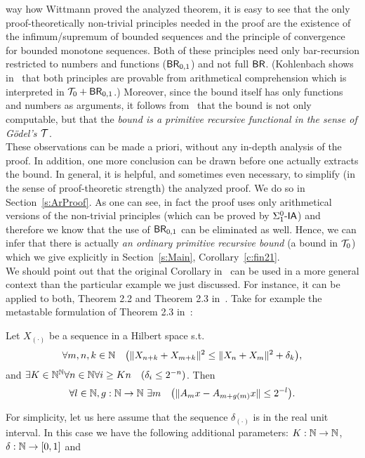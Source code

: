 way how Wittmann proved the analyzed theorem, it is easy to see 
that the only proof-theoretically non-trivial principles needed in the proof are 
the existence of the infimum/supremum of bounded sequences and 
the principle of convergence for bounded monotone sequences.
Both of these principles need only bar-recursion restricted to numbers and functions ($\textsf{\upshape BR}_{0,1}$)
and not full $\textsf{\upshape BR}$. (Kohlenbach shows in~\cite{Kohlenbach08, Kohlenbach00} that both principles
are provable from arithmetical comprehension which is interpreted in $\mathcal{T}_0+\textsf{\upshape BR}_{0,1}$.) 
Moreover, since the bound itself has only functions and numbers as arguments, 
it follows from~\cite{Schwichtenberg79, Kohlenbach99} that
the bound is not only computable, but that the {\em bound
is a primitive recursive functional in the sense of G\"odel's $\mathcal{T}$}.\\
These observations can be made a priori, without any in-depth analysis of the proof. In addition,
one more conclusion can be drawn before one actually extracts the bound. In general, it is helpful, and sometimes
even necessary, to simplify (in the sense of proof-theoretic strength) the analyzed proof. We do so
in Section~\ref{s:ArProof}. As one can see, in fact the proof uses only arithmetical versions of
the non-trivial principles (which can be proved by $\Sigma^0_1\textsf{\upshape -}\textsf{\upshape IA}$) and therefore we 
know that the use of $\textsf{\upshape BR}_{0,1}$ can be eliminated as well. 
Hence, we can infer that there is actually {\em an ordinary primitive recursive bound} (a bound in $\mathcal{T}_0$)
which we give explicitly in Section~\ref{s:Main}, Corollary~\ref{c:fin21}.\\
We should point out that the original Corollary in~\cite{GK08} can be used
in a more general context than the particular example we just discussed. For instance, it can be 
applied to both, Theorem 2.2 and Theorem 2.3 in~\cite{Wittmann90}. Take for example the metastable 
formulation of Theorem 2.3 in~\cite{Wittmann90}:
\begin{thm}\label{t:fin23l}
Let $X_{(\cdot)}$ be a sequence in a Hilbert space s.t. 
\[
\forall m,n,k\in\NN\quad \big(\|X_{n+k}+X_{m+k}\|^2 \leq \|X_{n}+X_{m}\|^2 + \delta_k\big), %
\] and $\exists K\in\mathbb{N}^{\mathbb{N}}\forall n\in\mathbb{N} \forall i\geq Kn\quad (\delta_i\leq 2^{-n})$.
Then
\[
\forall l\in\mathbb{N}, g:\mathbb{N}\to\mathbb{N}\ \exists m\quad \big( \|A_mx-A_{m+g(m)}x\|\leq 2^{-l} \big).
\]
\end{thm}
For simplicity, let us
here assume that the sequence $\delta_{(\cdot)}$ is in the real unit interval.
In this case we have the following additional parameters: $K:\mathbb{N}\to\mathbb{N}$, $\delta:\mathbb{N}\to[0,1]$ and
